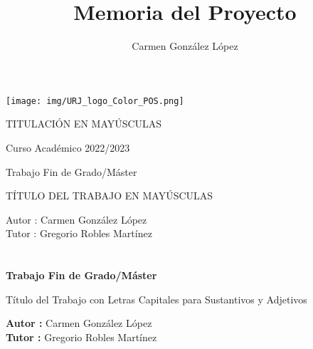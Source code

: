 \documentclass[a4paper, 12pt]{book}
\title{Memoria del Proyecto}
\author{Carmen González López}
\begin{document}
\renewcommand{\refname}{Bibliografía}  %
\renewcommand{\appendixname}{Apéndice}


\begin{titlepage}
\begin{center}
\texttt{[image: img/URJ\_logo\_Color\_POS.png]}

\vspace{1.75cm}

\Large
TITULACIÓN EN MAYÚSCULAS

\vspace{0.4cm}

\large
Curso Académico 2022/2023

\vspace{0.8cm}

Trabajo Fin de Grado/Máster

\vspace{2.5cm}

\LARGE
TÍTULO DEL TRABAJO EN MAYÚSCULAS

\vspace{4cm}

\large
Autor : Carmen González López \\
Tutor : Gregorio Robles Martínez
\end{center}
\end{titlepage}

\newpage
\mbox{}
\thispagestyle{empty} %


\clearpage
{}
\chapter*{}

\vspace{-4cm}
\begin{center}
\LARGE
\textbf{Trabajo Fin de Grado/Máster}

\vspace{1cm}
\large
Título del Trabajo con Letras Capitales para Sustantivos y Adjetivos

\vspace{1cm}
\large
\textbf{Autor :} Carmen González López\\
\textbf{Tutor :} Gregorio Robles Martínez

\end{center}
\end{document}
